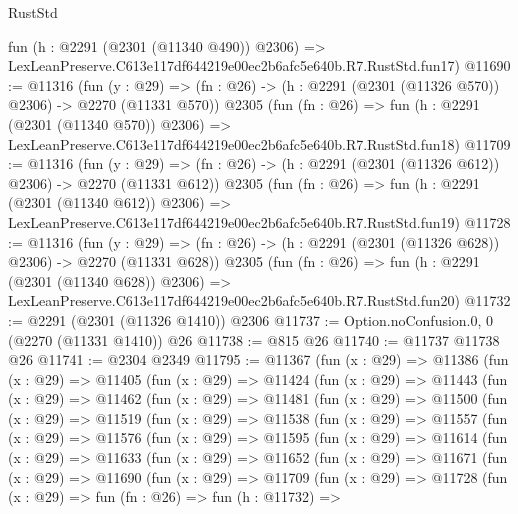 \begin{lexlean}{RustStd}
\begin{coremodule}
    fun (h : @2291 (@2301 (@11340 @490)) @2306) =>
    LexLeanPreserve.C613e117df644219e00ec2b6afc5e640b.R7.RustStd.fun17)
@11690 := @11316
    (fun (y : @29) => (fn : @26) -> (h : @2291 (@2301 (@11326 @570)) @2306) -> @2270 (@11331 @570))
    @2305
    (fun (fn : @26) =>
    fun (h : @2291 (@2301 (@11340 @570)) @2306) =>
    LexLeanPreserve.C613e117df644219e00ec2b6afc5e640b.R7.RustStd.fun18)
@11709 := @11316
    (fun (y : @29) => (fn : @26) -> (h : @2291 (@2301 (@11326 @612)) @2306) -> @2270 (@11331 @612))
    @2305
    (fun (fn : @26) =>
    fun (h : @2291 (@2301 (@11340 @612)) @2306) =>
    LexLeanPreserve.C613e117df644219e00ec2b6afc5e640b.R7.RustStd.fun19)
@11728 := @11316
    (fun (y : @29) => (fn : @26) -> (h : @2291 (@2301 (@11326 @628)) @2306) -> @2270 (@11331 @628))
    @2305
    (fun (fn : @26) =>
    fun (h : @2291 (@2301 (@11340 @628)) @2306) =>
    LexLeanPreserve.C613e117df644219e00ec2b6afc5e640b.R7.RustStd.fun20)
@11732 := @2291 (@2301 (@11326 @1410)) @2306
@11737 := Option.noConfusion.{0, 0} (@2270 (@11331 @1410)) @26
@11738 := @815 @26
@11740 := @11737 @11738 @26
@11741 := @2304 @2349
@11795 := @11367
    (fun (x : @29) =>
    @11386
      (fun (x : @29) =>
      @11405
        (fun (x : @29) =>
        @11424
          (fun (x : @29) =>
          @11443
            (fun (x : @29) =>
            @11462
              (fun (x : @29) =>
              @11481
                (fun (x : @29) =>
                @11500
                  (fun (x : @29) =>
                  @11519
                    (fun (x : @29) =>
                    @11538
                      (fun (x : @29) =>
                      @11557
                        (fun (x : @29) =>
                        @11576
                          (fun (x : @29) =>
                          @11595
                            (fun (x : @29) =>
                            @11614
                              (fun (x : @29) =>
                              @11633
                                (fun (x : @29) =>
                                @11652
                                  (fun (x : @29) =>
                                  @11671
                                    (fun (x : @29) =>
                                    @11690
                                      (fun (x : @29) =>
                                      @11709
                                        (fun (x : @29) =>
                                        @11728
                                          (fun (x : @29) =>
                                          fun (fn : @26) =>
                                          fun (h : @11732) =>

\end{coremodule}
\end{lexlean}
